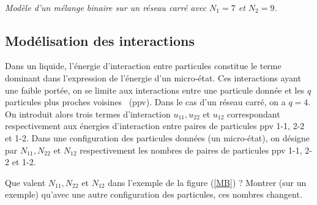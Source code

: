 \documentclass[utf8, 11pt]{feuille}
\begin{document}
\begin{center} \\
\textit{Modèle d'un mélange binaire sur un réseau carré avec $N_1=7$ et $N_2=9$.}
\label{MB}
\end{center}


\subsection*{Modélisation des interactions}

Dans un liquide, l'énergie d'interaction entre particules constitue le terme dominant dans l'expression de l'énergie d'un micro-état. Ces interactions ayant une faible portée, on se limite aux interactions entre une particule donnée et les $q$ particules \og plus proches voisines \fg \ (ppv). Dans le cas d'un réseau carré, on a $q = 4$. On introduit alors trois termes d'interaction $u_{11}, u_{22}$ et $u_{12}$ correspondant respectivement aux énergies d'interaction entre paires de particules ppv 1-1, 2-2 et 1-2. Dans une configuration des particules données (un micro-état), on désigne par $N_{11}, N_{22}$ et $N_{12}$ respectivement les nombres de paires de particules ppv 1-1, 2-2 et 1-2.

\question
Que valent $N_{11}, N_{22}$ et $N_{12}$ dans l'exemple de la figure (\ref{MB}) ? Montrer (sur un exemple) qu'avec une autre configuration des particules, ces nombres changent.
\end{document}

